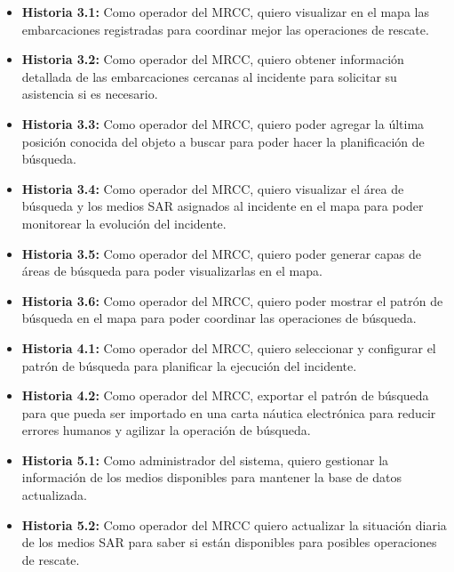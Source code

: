 
\begin{itemize}
    \item \textbf{Historia 3.1:} Como operador del MRCC, quiero visualizar en el mapa las embarcaciones registradas para coordinar 
    mejor las operaciones de rescate.
    \item \textbf{Historia 3.2:} Como operador del MRCC, quiero obtener información detallada de las embarcaciones cercanas al incidente 
    para solicitar su asistencia si es necesario.
    \item \textbf{Historia 3.3:} Como operador del MRCC, quiero poder agregar la última posición conocida del objeto a buscar para poder 
    hacer la planificación de búsqueda.
    \item \textbf{Historia 3.4:} Como operador del MRCC, quiero visualizar el área de búsqueda  y los medios SAR asignados al incidente 
    en el mapa para poder monitorear la evolución del incidente.
    \item \textbf{Historia 3.5:} Como operador del MRCC, quiero poder generar capas de áreas de búsqueda para poder visualizarlas en el mapa.
    \item \textbf{Historia 3.6:} Como operador del MRCC, quiero poder mostrar el patrón de búsqueda en el mapa para poder coordinar las 
    operaciones de búsqueda.
\end{itemize}


\begin{itemize}
    \item \textbf{Historia 4.1:} Como operador del MRCC, quiero seleccionar y configurar el patrón de búsqueda para planificar la 
    ejecución del incidente.
    \item \textbf{Historia 4.2:} Como operador del MRCC, exportar el patrón de búsqueda para que pueda ser importado en una carta 
    náutica electrónica para reducir errores humanos y agilizar la operación de búsqueda.
\end{itemize}


\begin{itemize}
    \item \textbf{Historia 5.1:} Como administrador del sistema, quiero gestionar la información de los medios disponibles para mantener 
    la base de datos actualizada.
    \item \textbf{Historia 5.2:} Como operador del MRCC quiero actualizar la situación diaria de los medios SAR para saber si están 
    disponibles para posibles operaciones de rescate.
\end{itemize}


